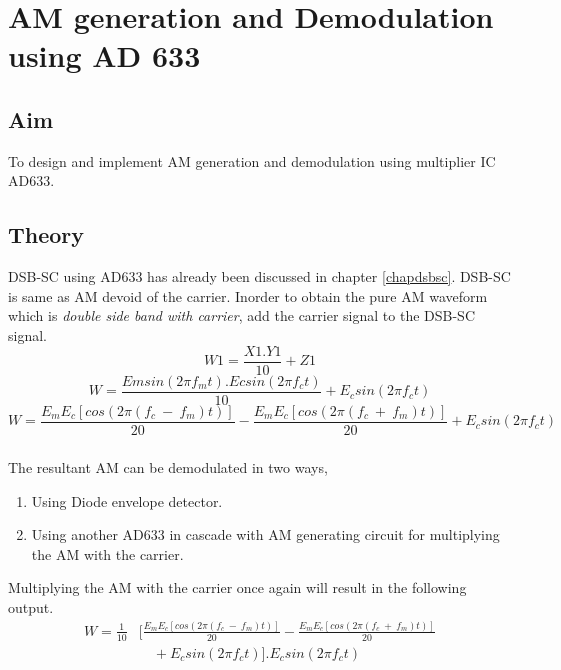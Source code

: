 
\chapter[AM generation and Demodulation using AD 633]{AM generation and Demodulation using AD 633}
\section*{Aim}
To design and implement AM generation and demodulation using multiplier IC AD633.
\section*{Theory}
DSB-SC using AD633 has already been discussed in chapter \ref{chapdsbsc}. DSB-SC is same as AM devoid of the carrier. Inorder to obtain the pure AM waveform which is \emph{double side band with carrier}, add the carrier signal to the DSB-SC signal.
\begin{equation}
W1= \frac{X1.Y1}{10}+Z1
\end{equation}
\begin{equation}
W= \frac{Emsin(2\pi f_mt).Ecsin(2\pi f_ct)}{10}+E_c sin(2\pi f_ct)
\end{equation}
\begin{equation}
W= \frac{E_mE_c [cos (2\pi (f_c\ -\ f_m)t)]}{20}- \frac{E_mE_c[cos (2\pi (f_c\ +\ f_m)t)]}{20}+E_c sin(2\pi f_ct)
\end{equation}

\paragraph{}
	The resultant AM can be demodulated in two ways,
 \begin{enumerate}

\item
Using Diode envelope detector.
\item
Using another AD633 in cascade with AM generating circuit for multiplying the AM with the carrier.
\end{enumerate}

Multiplying the AM with the carrier once again will result in the following output.
\begin{equation}
\begin{split}
W=\frac{1}{10} &[ \frac{E_mE_c [cos (2\pi (f_c\ -\ f_m)t)]}{20}- \frac{E_mE_c[cos (2\pi (f_c\ +\ f_m)t)]}{20}\\
&\quad +E_c sin(2\pi f_ct)].E_c sin(2\pi f_ct)
\end{split}
\end{equation}

